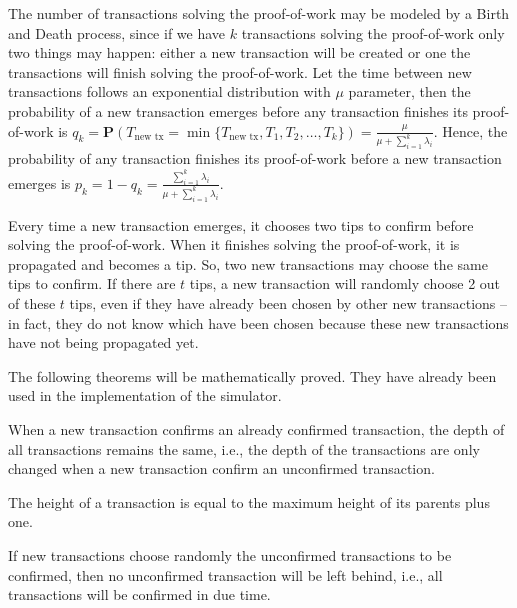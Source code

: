 
The number of transactions solving the proof-of-work may be modeled by a Birth and Death process, since if we have $k$ transactions solving the proof-of-work only two things may happen: either a new transaction will be created or one the transactions will finish solving the proof-of-work. Let the time between new transactions follows an exponential distribution with $\mu$ parameter, then the probability of a new transaction emerges before any transaction finishes its proof-of-work is $q_k = \mathbf{P}(T_{\text{new tx}} = \min\{T_{\text{new tx}}, T_1, T_2, \dots, T_k\}) = \frac{\mu}{\mu + \sum_{i=1}^k \lambda_i}$. Hence, the probability of any transaction finishes its proof-of-work before a new transaction emerges is $p_k = 1 - q_k = \frac{\sum_{i=1}^k \lambda_i}{\mu + \sum_{i=1}^k \lambda_i}$.

Every time a new transaction emerges, it chooses two tips to confirm before solving the proof-of-work. When it finishes solving the proof-of-work, it is propagated and becomes a tip. So, two new transactions may choose the same tips to confirm. If there are $t$ tips, a new transaction will randomly choose 2 out of these $t$ tips, even if they have already been chosen by other new transactions -- in fact, they do not know which have been chosen because these new transactions have not being propagated yet.

The following theorems will be mathematically proved. They have already been used in the implementation of the simulator.

\begin{theorem}
\label{theorem-new-tx-not-tip}
When a new transaction confirms an already confirmed transaction, the depth of all transactions remains the same, i.e., the depth of the transactions are only changed when a new transaction confirm an unconfirmed transaction.
\end{theorem}

\begin{theorem}
The height of a transaction is equal to the maximum height of its parents plus one.
\end{theorem}

\begin{theorem}
If new transactions choose randomly the unconfirmed transactions to be confirmed, then no unconfirmed transaction will be left behind, i.e., all transactions will be confirmed in due time.
\end{theorem}

